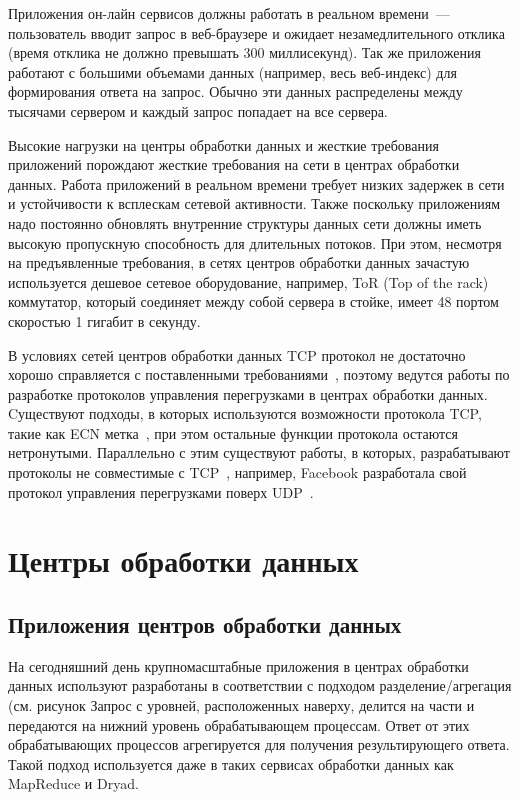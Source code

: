 \documentclass[14pt, a4paper,oneside]{extarticle}
\begin{document}
Приложения он-лайн сервисов должны работать в реальном времени~--- пользователь вводит запрос в веб-браузере и ожидает незамедлительного отклика (время отклика не должно превышать 300 миллисекунд). 
Так же приложения работают с большими объемами данных (например, весь веб-индекс) для формирования ответа на запрос. Обычно эти данных распределены между тысячами сервером и каждый запрос попадает на все сервера.

Высокие нагрузки на центры обработки данных и жесткие требования приложений порождают жесткие требования на сети в центрах обработки данных. Работа приложений в реальном времени требует низких задержек в сети и устойчивости к всплескам сетевой активности. Также поскольку приложениям надо постоянно обновлять внутренние структуры данных сети должны иметь высокую пропускную способность для длительных потоков. При этом, несмотря на предъявленные требования, в сетях центров обработки данных зачастую используется дешевое сетевое оборудование, например, ToR (Top of the rack) коммутатор, который соединяет между собой сервера в стойке, имеет 48 портом скоростью 1 гигабит в секунду.

В условиях сетей центров обработки данных TCP протокол не достаточно хорошо справляется с поставленными требованиями~\cite{dctcp}, поэтому ведутся работы по разработке протоколов управления перегрузками в центрах обработки данных.
Cуществуют подходы, в которых используются возможности протокола TCP, такие как ECN метка~\cite{dctp, d2tcp}, при этом остальные функции протокола остаются нетронутыми.
Параллельно с этим существуют работы, в которых, разрабатывают протоколы не совместимые с TCP~\cite{d3tcp}, например, Facebook разработала свой протокол управления перегрузками поверх UDP~\cite{facebook}.

\newpage

\section{Центры обработки данных}
\subsection{Приложения центров обработки данных}

На сегодняшний день крупномасштабные приложения в центрах обработки данных используют разработаны в соответствии с подходом разделение/агрегация (см. рисунок %
Запрос с уровней, расположенных наверху, делится на части и передаются на нижний уровень обрабатывающем процессам. Ответ от этих обрабатывающих процессов агрегируется для получения результирующего ответа. Такой подход используется даже в таких сервисах обработки данных как MapReduce и  Dryad. %
\end{document}
